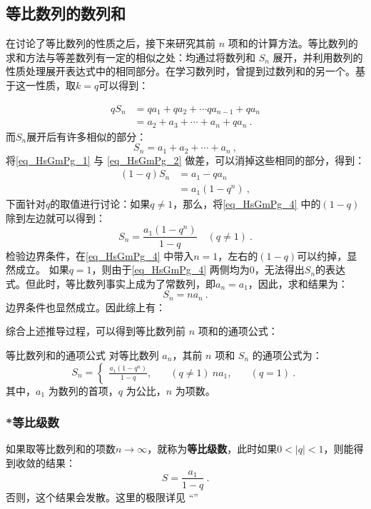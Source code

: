 \subsection{等比数列的数列和}

在讨论了等比数列的性质之后，接下来研究其前 $n$ 项和的计算方法。等比数列的求和方法与等差数列有一定的相似之处：均通过将数列和 $S_n$ 展开，并利用数列的性质处理展开表达式中的相同部分。在学习数列时，曾提到过数列和的另一个。基于这一性质，取$k=q$可以得到：

\begin{equation}\label{eq_HsGmPg_1}
\begin{aligned}
qS_n &= qa_1 + qa_2 + \cdots qa_{n-1}+ qa_n\\
&=a_2 + a_3 + \cdots + a_n+qa_n~.
\end{aligned}
\end{equation}
而$S_n$展开后有许多相似的部分：
\begin{equation}\label{eq_HsGmPg_2}
S_n = a_1 + a_2 + \cdots + a_n~,
\end{equation}
将\autoref{eq_HsGmPg_1} 与 \autoref{eq_HsGmPg_2} 做差，可以消掉这些相同的部分，得到：
\begin{equation}\label{eq_HsGmPg_4}
\begin{aligned}
(1 - q)S_n &= a_1 - qa_n\\
&= a_1(1 - q^n)~,
\end{aligned}
\end{equation}
下面针对$q$的取值进行讨论：如果$q\neq1$，那么，将\autoref{eq_HsGmPg_4} 中的$(1-q)$除到左边就可以得到：
\begin{equation}
S_n = \frac{a_1(1-q^n)}{1-q} \quad (q\neq 1)~.
\end{equation}
检验边界条件，在\autoref{eq_HsGmPg_4} 中带入$n=1$，左右的$(1-q)$可以约掉，显然成立。
如果$q=1$，则由于\autoref{eq_HsGmPg_4} 两侧均为0，无法得出$S_n$的表达式。但此时，等比数列事实上成为了常数列，即$a_n=a_1$，因此，求和结果为：
\begin{equation}
S_n=na_n~.
\end{equation}
边界条件也显然成立。因此综上有：


综合上述推导过程，可以得到等比数列前 $n$ 项和的通项公式：
\begin{corollary}{等比数列和的通项公式}
对等比数列 ${a_n}$，其前 $n$ 项和 $S_n$ 的通项公式为：
\begin{equation}
S_n = \begin{cases}
\displaystyle\frac{a_1(1 - q^n)}{1 - q}, & \quad (q \neq 1) \
na_1, & \quad (q = 1)~.
\end{cases}
\end{equation}
其中，$a_1$ 为数列的首项，$q$ 为公比，$n$ 为项数。
\end{corollary}

\subsubsection{*等比级数}

如果取等比数列和的项数$n\rightarrow \infty$，就称为\textbf{等比级数}，此时如果$0<|q|<1$，则能得到收敛的结果：
\begin{equation}
S = \frac{a_1}{1 - q}~.
\end{equation}
否则，这个结果会发散。这里的极限详见 “”
